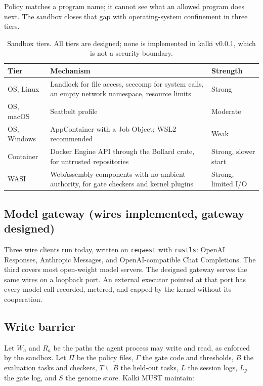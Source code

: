 \documentclass[11pt,a4paper]{article}
\begin{document}
Policy matches a program name; it cannot see what an allowed program does next. The sandbox closes that gap with operating-system confinement in three tiers.

\begin{table}[h]
\centering
\small
\begin{tabularx}{\textwidth}{@{}lXl@{}}
\toprule
Tier & Mechanism & Strength \\
\midrule
OS, Linux & Landlock for file access, seccomp for system calls, an empty network namespace, resource limits & Strong \\
OS, macOS & Seatbelt profile & Moderate \\
OS, Windows & AppContainer with a Job Object; WSL2 recommended & Weak \\
Container & Docker Engine API through the Bollard crate, for untrusted repositories & Strong, slower start \\
WASI & WebAssembly components with no ambient authority, for gate checkers and kernel plugins & Strong, limited I/O \\
\bottomrule
\end{tabularx}
\caption{Sandbox tiers. All tiers are designed; none is implemented in kalki v0.0.1, which is not a security boundary.}
\label{tab:sandbox}
\end{table}

\subsection{Model gateway (wires implemented, gateway designed)}

Three wire clients run today, written on \texttt{reqwest} with \texttt{rustls}: OpenAI Responses, Anthropic Messages, and OpenAI-compatible Chat Completions. The third covers most open-weight model servers. The designed gateway serves the same wires on a loopback port. An external executor pointed at that port has every model call recorded, metered, and capped by the kernel without its cooperation.

\subsection{Write barrier}
\label{sec:barrier}

Let $W_a$ and $R_a$ be the paths the agent process may write and read, as enforced by the sandbox. Let $\Pi$ be the policy files, $\Gamma$ the gate code and thresholds, $B$ the evaluation tasks and checkers, $T\subseteq B$ the held-out tasks, $L$ the session logs, $L_g$ the gate log, and $S$ the genome store. Kalki MUST maintain:
\end{document}
